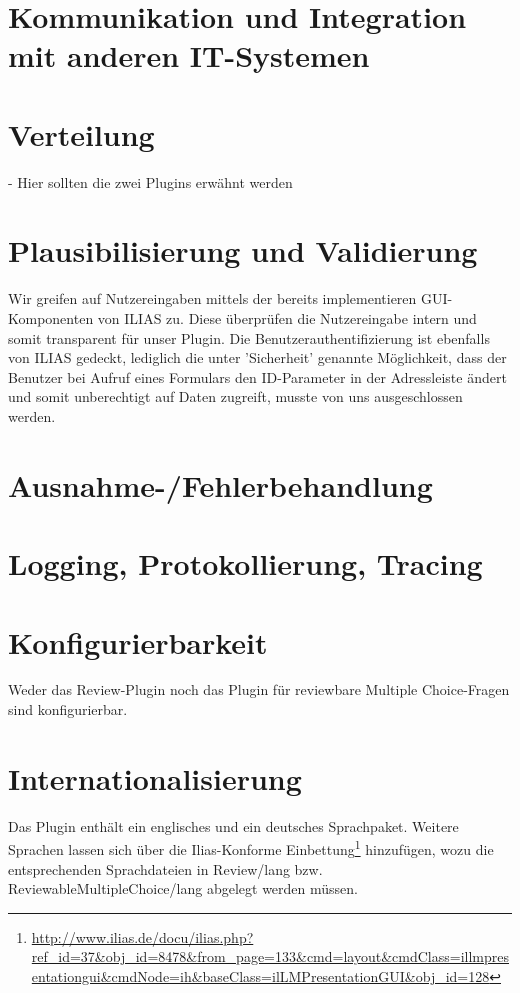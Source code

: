 \documentclass[a4paper]{scrreprt}
\begin{document}
\section{Kommunikation und Integration mit anderen IT-Systemen}
\section{Verteilung}
- Hier sollten die zwei Plugins erwähnt werden
\section{Plausibilisierung und Validierung}
Wir greifen auf Nutzereingaben mittels der bereits implementieren GUI-Komponenten von ILIAS zu. Diese überprüfen die Nutzereingabe intern und somit transparent für unser Plugin. Die Benutzerauthentifizierung ist ebenfalls von ILIAS gedeckt, lediglich die unter 'Sicherheit' genannte Möglichkeit, dass der Benutzer bei Aufruf eines Formulars den ID-Parameter in der Adressleiste ändert und somit unberechtigt auf Daten zugreift, musste von uns ausgeschlossen werden.
\section{Ausnahme-/Fehlerbehandlung}
\section{Logging, Protokollierung, Tracing}
\section{Konfigurierbarkeit}
Weder das Review-Plugin noch das Plugin für reviewbare Multiple Choice-Fragen sind konfigurierbar.
\section{Internationalisierung}
Das Plugin enthält ein englisches und ein deutsches Sprachpaket. Weitere Sprachen lassen sich über die Ilias-Konforme Einbettung\footnote{\url{http://www.ilias.de/docu/ilias.php?ref_id=37&obj_id=8478&from_page=133&cmd=layout&cmdClass=illmpresentationgui&cmdNode=ih&baseClass=ilLMPresentationGUI&obj_id=128}} 
 hinzufügen, wozu die entsprechenden Sprachdateien in Review/lang bzw. ReviewableMultipleChoice/lang abgelegt werden müssen.
\end{document}
